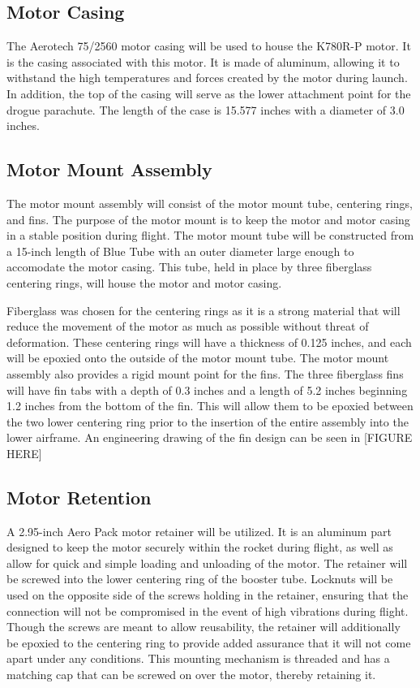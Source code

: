     \subsection{Motor Casing}
The Aerotech 75/2560 motor casing will be used to house the K780R-P motor. It is the casing associated with this motor. It is made of aluminum, allowing it to withstand the high temperatures and forces created by the motor during launch. In addition, the top of the casing will serve as the lower attachment point for the drogue parachute. The length of the case is 15.577 inches with a diameter of 3.0 inches.


    \subsection{Motor Mount Assembly}
The motor mount assembly will consist of the motor mount tube, centering rings, and fins. The purpose of the motor mount is to keep the motor and motor casing in a stable position during flight. The motor mount tube will be constructed from a 15-inch length of Blue Tube with an outer diameter large enough to accomodate the motor casing. This tube, held in place by three fiberglass centering rings, will house the motor and motor casing.

Fiberglass was chosen for the centering rings as it is a strong material that will reduce the movement of the motor as much as possible without threat of deformation. These centering rings will have a thickness of 0.125 inches, and each will be epoxied onto the outside of the motor mount tube. The motor mount assembly also provides a rigid mount point for the fins. The three fiberglass fins will have fin tabs with a depth of 0.3 inches and a length of 5.2 inches beginning 1.2 inches from the bottom of the fin. This will allow them to be epoxied between the two lower centering ring prior to the insertion of the entire assembly into the lower airframe. An engineering drawing of the fin design can be seen in [FIGURE HERE]


    \subsection{Motor Retention}
A 2.95-inch Aero Pack motor retainer will be utilized. It is an aluminum part designed to keep the motor securely within the rocket during flight, as well as allow for quick and simple loading and unloading of the motor. The retainer will be screwed into the lower centering ring of the booster tube. Locknuts will be used on the opposite side of the screws holding in the retainer, ensuring that the connection will not be compromised in the event of high vibrations during flight. Though the screws are meant to allow reusability, the retainer will additionally be epoxied to the centering ring to provide added assurance that it will not come apart under any conditions. This mounting mechanism is threaded and has a matching cap that can be screwed on over the motor, thereby retaining it.

